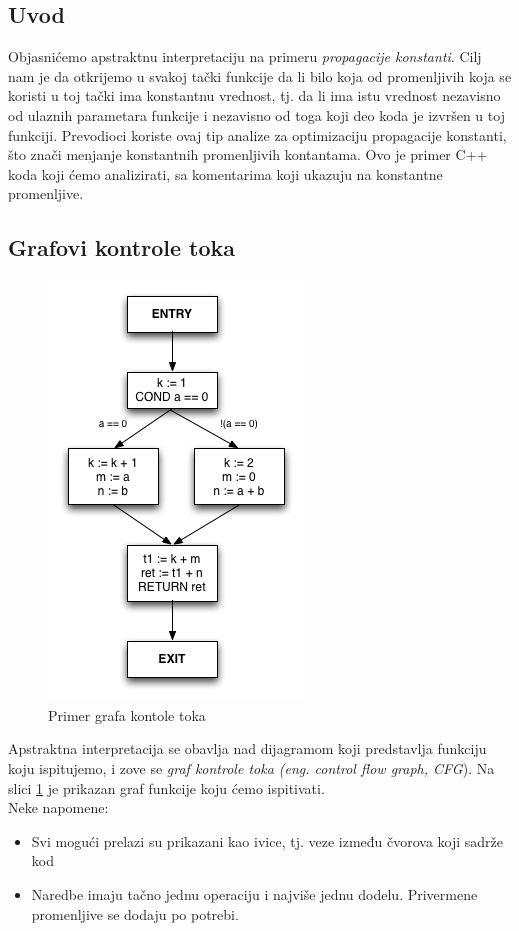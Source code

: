 \subsection{Uvod}
\label{subsec:uvod}

Objasnićemo apstraktnu interpretaciju na primeru \emph{propagacije konstanti}. 
Cilj nam je da otkrijemo u svakoj tački funkcije da li bilo koja od promenljivih koja se koristi u toj tački ima konstantnu vrednost, tj. da li ima istu vrednost nezavisno od ulaznih parametara funkcije i nezavisno od toga koji deo koda je izvršen u toj funkciji. 
Prevodioci koriste ovaj tip analize za optimizaciju propagacije konstanti, što znači menjanje konstantnih promenljivih kontantama. 
Ovo je primer C++ koda koji ćemo analizirati, sa komentarima koji ukazuju na konstantne promenljive.


\subsection{Grafovi kontrole toka}
\label{subsec:cfgs}

\begin{figure}
\begin{center}
\includegraphics[scale=0.5]{Treehydra-cfg.png}
\end{center}
\caption{Primer grafa kontole toka}
\label{fig:graf}
\end{figure}

Apstraktna interpretacija se obavlja nad dijagramom koji predstavlja funkciju koju ispitujemo, i zove se \emph{graf kontrole toka (eng. control flow graph, CFG}). Na slici \ref{fig:graf} je prikazan graf funkcije koju ćemo ispitivati. \\
Neke napomene:
\begin{itemize}
\item Svi mogući prelazi su prikazani kao ivice, tj. veze između čvorova koji sadrže kod
\item Naredbe imaju tačno jednu operaciju i najviše jednu dodelu. Privermene promenljive se dodaju po potrebi.
\end{itemize}

